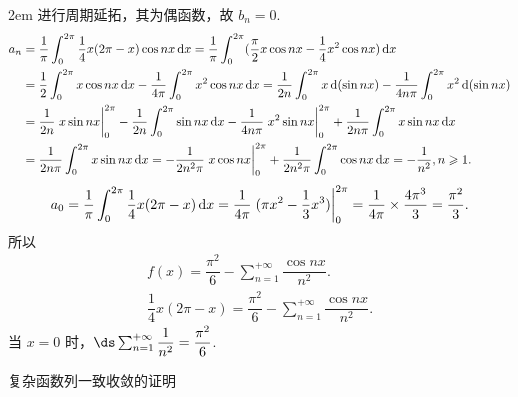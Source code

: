 \documentclass[UTF8,14pt,normal]{ctexart}
\begin{document}
    \hangindent 2em
    \noindent
    进行周期延拓，其为偶函数，故 \(b_n = 0\).
    \begin{align*}
        a_n & = \dfrac{1}{\pi} \int_{0}^{2\pi} \dfrac{1}{4} x(2\pi - x)\cos nx \dd{x} = \dfrac{1}{\pi} \int_{0}^{2\pi} (\dfrac{\pi}{2} x \cos nx - \dfrac{1}{4} x^2 \cos nx) \dd{x} \\
        & = \dfrac{1}{2} \int_{0}^{2\pi} x \cos nx \dd{x} - \dfrac{1}{4\pi} \int_{0}^{2\pi} x^2 \cos nx \dd{x} = \dfrac{1}{2n} \int_0^{2\pi} x \dd(\sin nx) - \dfrac{1}{4n\pi} \int_0^{2\pi} x^2 \dd(\sin nx) \\
        & = \dfrac{1}{2n} \eval{x \sin nx}_0^{2\pi} - \dfrac{1}{2n} \int_0^{2\pi} \sin nx \dd{x} - \dfrac{1}{4n\pi} \eval{x^2 \sin nx}_0^{2\pi} + \dfrac{1}{2n\pi} \int_0^{2\pi} x \sin nx \dd{x} \\
        & = \dfrac{1}{2n\pi} \int_0^{2\pi} x \sin nx \dd{x} = -\dfrac{1}{2n^2\pi} \eval{x \cos nx}_0^{2\pi} + \dfrac{1}{2n^2\pi} \int_0^{2\pi} \cos nx \dd{x} = -\dfrac{1}{n^2}, n \geqslant 1.
    \end{align*}
    \[
        a_0 = \dfrac{1}{\pi} \int_{0}^{2\pi} \dfrac{1}{4} x(2\pi - x) \dd{x} = \dfrac{1}{4\pi} \eval{(\pi x^2 - \dfrac{1}{3} x^3)}_{0}^{2\pi} = \dfrac{1}{4\pi} \times \dfrac{4\pi^3}{3} = \dfrac{\pi^2}{3}.
    \]
    所以
    \begin{gather*}
        f(x) = \dfrac{\pi^2}{6} - \sum_{n = 1}^{+\infty} \dfrac{\cos nx}{n^2}. \\
        \dfrac{1}{4} x(2\pi - x) = \dfrac{\pi^2}{6} - \sum_{n = 1}^{+\infty} \dfrac{\cos nx}{n^2}.
    \end{gather*}
    当 \(x = 0\) 时，\(\ds \sum_{n = 1}^{+\infty} \dfrac{1}{n^2} = \dfrac{\pi^2}{6}\).

 复杂函数列一致收敛的证明
\end{document}
